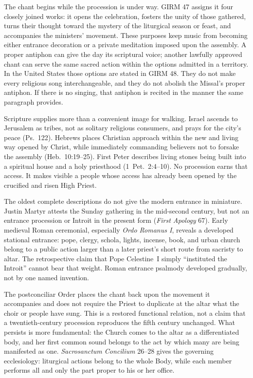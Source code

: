 The chant begins while the procession is under way. GIRM 47 assigns it four closely joined works: it opens the celebration, fosters the unity of those gathered, turns their thought toward the mystery of the liturgical season or feast, and accompanies the ministers' movement. These purposes keep music from becoming either entrance decoration or a private meditation imposed upon the assembly. A proper antiphon can give the day its scriptural voice; another lawfully approved chant can serve the same sacred action within the options admitted in a territory. In the United States those options are stated in GIRM 48. They do not make every religious song interchangeable, and they do not abolish the Missal's proper antiphon. If there is no singing, that antiphon is recited in the manner the same paragraph provides.

Scripture supplies more than a convenient image for walking. Israel ascends to Jerusalem as tribes, not as solitary religious consumers, and prays for the city's peace (Ps.~122). Hebrews places Christian approach within the new and living way opened by Christ, while immediately commanding believers not to forsake the assembly (Heb.~10:19--25). First Peter describes living stones being built into a spiritual house and a holy priesthood (1~Pet.~2:4--10). No procession earns that access. It makes visible a people whose access has already been opened by the crucified and risen High Priest.

The oldest complete descriptions do not give the modern entrance in miniature. Justin Martyr attests the Sunday gathering in the mid-second century, but not an entrance procession or Introit in the present form (\emph{First Apology} 67). Early medieval Roman ceremonial, especially \emph{Ordo Romanus I}, reveals a developed stational entrance: pope, clergy, schola, lights, incense, book, and urban church belong to a public action larger than a later priest's short route from sacristy to altar. The retrospective claim that Pope Celestine~I simply ``instituted the Introit'' cannot bear that weight. Roman entrance psalmody developed gradually, not by one named invention.

The postconciliar Order places the chant back upon the movement it accompanies and does not require the Priest to duplicate at the altar what the choir or people have sung. This is a restored functional relation, not a claim that a twentieth-century procession reproduces the fifth century unchanged. What persists is more fundamental: the Church comes to the altar as a differentiated body, and her first common sound belongs to the act by which many are being manifested as one. \emph{Sacrosanctum Concilium} 26--28 gives the governing ecclesiology: liturgical actions belong to the whole Body, while each member performs all and only the part proper to his or her office.

